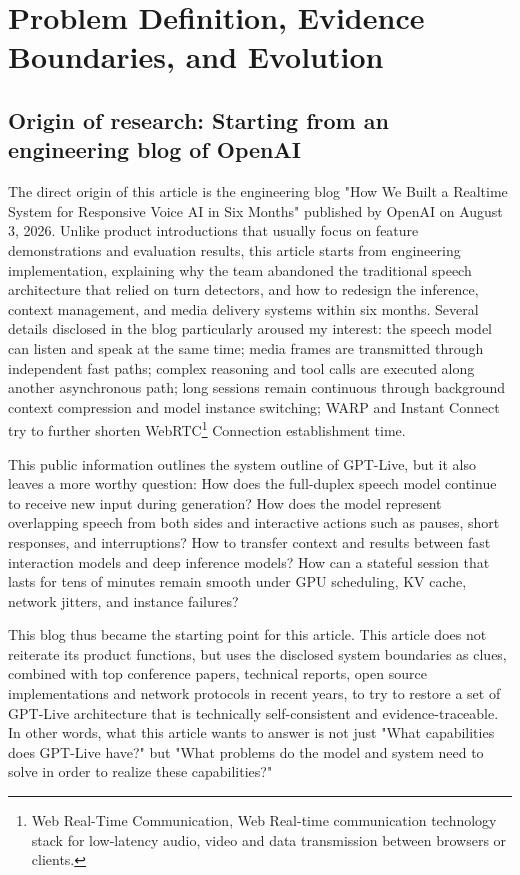 \documentclass[UTF8,fontset=none,a4paper,10pt]{ctexart}
\begin{document}
\clearpage
\begingroup
\small
\setlength{\parskip}{0pt}
\linespread{1.02}\selectfont
\setcounter{tocdepth}{2}
\tableofcontents
\endgroup
\clearpage

\section{Problem Definition, Evidence Boundaries, and Evolution}

\subsection{Origin of research: Starting from an engineering blog of OpenAI}

The direct origin of this article is the engineering blog "How We Built a Realtime System for Responsive Voice AI in Six Months" \cite{openai2026continuous} published by OpenAI on August 3, 2026. Unlike product introductions that usually focus on feature demonstrations and evaluation results, this article starts from engineering implementation, explaining why the team abandoned the traditional speech architecture that relied on turn detectors, and how to redesign the inference, context management, and media delivery systems within six months. Several details disclosed in the blog particularly aroused my interest: the speech model can listen and speak at the same time; media frames are transmitted through independent fast paths; complex reasoning and tool calls are executed along another asynchronous path; long sessions remain continuous through background context compression and model instance switching; WARP and Instant Connect try to further shorten WebRTC\footnote{Web Real-Time Communication, Web Real-time communication technology stack for low-latency audio, video and data transmission between browsers or clients. } Connection establishment time.

This public information outlines the system outline of GPT-Live, but it also leaves a more worthy question: How does the full-duplex speech model continue to receive new input during generation? How does the model represent overlapping speech from both sides and interactive actions such as pauses, short responses, and interruptions? How to transfer context and results between fast interaction models and deep inference models? How can a stateful session that lasts for tens of minutes remain smooth under GPU scheduling, KV cache, network jitters, and instance failures?

This blog thus became the starting point for this article. This article does not reiterate its product functions, but uses the disclosed system boundaries as clues, combined with top conference papers, technical reports, open source implementations and network protocols in recent years, to try to restore a set of GPT-Live architecture that is technically self-consistent and evidence-traceable. In other words, what this article wants to answer is not just "What capabilities does GPT-Live have?" but "What problems do the model and system need to solve in order to realize these capabilities?"
\end{document}

